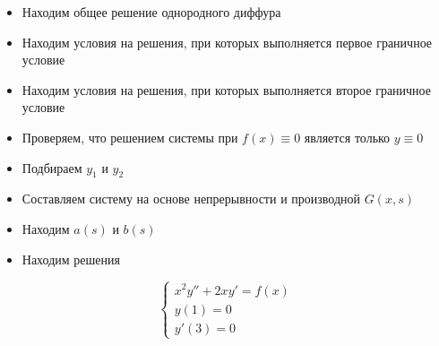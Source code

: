 \begin{algo}
  
  \begin{itemize}
    \item Находим общее решение однородного диффура
    \item Находим условия на решения, при которых выполняется первое граничное условие
    \item Находим условия на решения, при которых выполняется второе граничное условие
    \item Проверяем, что решением системы при $f(x) \equiv 0$ является только $y \equiv 0$
    \item Подбираем $y_1$ и $y_2$
    \item Составляем систему на основе непрерывности и производной $G(x, s)$
    \item Находим $a(s)$ и $b(s)$
    \item Находим решения
  \end{itemize}
\end{algo}


\begin{problem}
  $$
  \begin{cases}
    x^2y'' + 2xy' = f(x)\\
    y(1) = 0\\
    y'(3) = 0
  \end{cases}
  $$
\end{problem}

